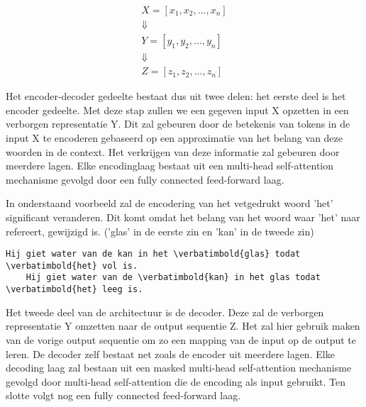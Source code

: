 \begin{equation}
\begin{split}
X = [x_1, x_2, ..., x_n]  \\
\Downarrow \;\;\;\;\;\;\;\;\;\;\;\;\;\;\; \\
Y = [y_1, y_2, ..., y_n] \\
\Downarrow \;\;\;\;\;\;\;\;\;\;\;\;\;\;\; \\
Z = [z_1, z_2, ..., z_n]
\end{split}
\end{equation}
\label{def:chapt2_transformers_encoder_decoder}    


Het encoder-decoder gedeelte bestaat dus uit twee delen: het eerste deel is het encoder gedeelte. Met deze stap zullen we een gegeven input X opzetten in een verborgen representatie Y. Dit zal gebeuren door de betekenis van tokens in de input X te encoderen gebaseerd op een approximatie van het belang van deze woorden in de context. Het verkrijgen van deze informatie zal gebeuren door meerdere lagen. Elke encodinglaag bestaat uit een multi-head self-attention mechanisme gevolgd door een fully connected feed-forward laag.     

In onderstaand voorbeeld zal de encodering van het vetgedrukt woord 'het' significant veranderen. Dit komt omdat het belang van het woord waar 'het' naar refereert, gewijzigd is. ('glas' in de eerste zin en 'kan' in de tweede zin)

\begin{Verbatim}[commandchars=\\\{\}]
    Hij giet water van de kan in het \verbatimbold{glas} todat \verbatimbold{het} vol is.
    Hij giet water van de \verbatimbold{kan} in het glas todat \verbatimbold{het} leeg is.
\end{Verbatim}

Het tweede deel van de architectuur is de decoder. Deze zal de verborgen representatie Y omzetten naar de output sequentie Z. Het zal hier gebruik maken van de vorige output sequentie om zo een mapping van de input op de output te leren. De decoder zelf bestaat net zoals de encoder uit meerdere lagen. Elke decoding laag zal bestaan uit een masked multi-head self-attention mechanisme gevolgd door multi-head self-attention die de encoding als input gebruikt. Ten slotte volgt nog een fully connected feed-forward laag.



